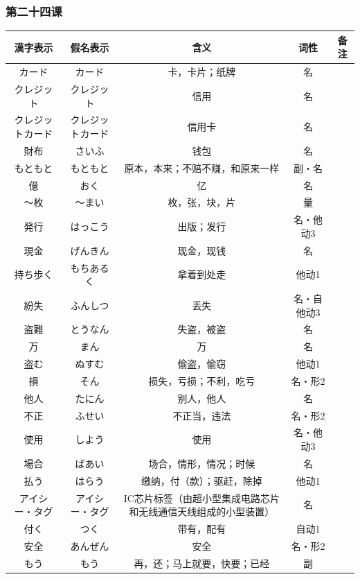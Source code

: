 \subsubsection{第二十四课}
\begin{longtable}{|c|c|c|c|c|}
    \hline
漢字表示 & 假名表示  & 含义 & 词性 & 备注 \\ \hline\hline
カード & カード & 卡，卡片；纸牌 & 名 &  \\ \hline
クレジット & クレジット & 信用 & 名 &  \\ \hline
クレジットカード & クレジットカード & 信用卡 & 名 &  \\ \hline
財布 & さいふ & 钱包 & 名 &  \\ \hline
もともと & もともと & 原本，本来；不赔不赚，和原来一样 & 副・名 &  \\ \hline
億 & おく & 亿 & 名 &  \\ \hline
〜枚 & 〜まい & 枚，张，块，片 & 量 &  \\ \hline
発行 & はっこう & 出版；发行 & 名・他动3 &  \\ \hline
現金 & げんきん & 现金，现钱 & 名 &  \\ \hline
持ち歩く & もちあるく & 拿着到处走 & 他动1 &  \\ \hline
紛失 & ふんしつ & 丢失 & 名・自他动3 &  \\ \hline
盗難 & とうなん & 失盗，被盗 & 名 &  \\ \hline
万 & まん & 万 & 名 &  \\ \hline
盗む & ぬすむ & 偷盗，偷窃 & 他动1 &  \\ \hline
損 & そん & 损失，亏损；不利，吃亏 & 名・形2 &  \\ \hline
他人 & たにん & 别人，他人 & 名 &  \\ \hline
不正 & ふせい & 不正当，违法 & 名・形2 &  \\ \hline
使用 & しよう & 使用 & 名・他动3 &  \\ \hline
場合 & ばあい & 场合，情形，情况；时候 & 名 &  \\ \hline
払う & はらう & 缴纳，付（款）；驱赶，除掉 & 他动1 &  \\ \hline
アイシー・タグ & アイシー・タグ & IC芯片标签（由超小型集成电路芯片和无线通信天线组成的小型装置） & 名 &  \\ \hline
付く & つく & 带有，配有 & 自动1 &  \\ \hline
安全 & あんぜん & 安全 & 名・形2 &  \\ \hline
もう & もう & 再，还；马上就要，快要；已经 & 副 &  \\ \hline

\end{longtable}
